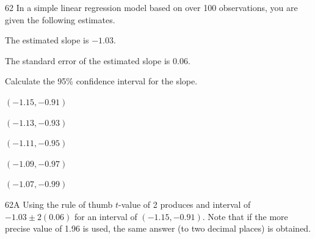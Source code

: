 \begin{question}{62}
In a simple linear regression model based on over 100 observations, you are given the following estimates.

\begin{given}
\item The estimated slope is $-1.03$.
\item The standard error of the estimated slope is 0.06.
\end{given}

Calculate the 95\% confidence interval for the slope.

\begin{choices}
\item $(-1.15, -0.91)$
\item $(-1.13, -0.93)$
\item $(-1.11, -0.95)$
\item $(-1.09, -0.97)$
\item $(-1.07, -0.99)$
\end{choices}
\end{question}
\begin{solution}{62}{A}
Using the rule of thumb $t$-value of 2 produces and interval of $-1.03 \pm 2(0.06)$ for an interval of $(-1.15, -0.91)$. Note that if the more precise value of 1.96 is used, the same answer (to two decimal places) is obtained.
\end{solution}

